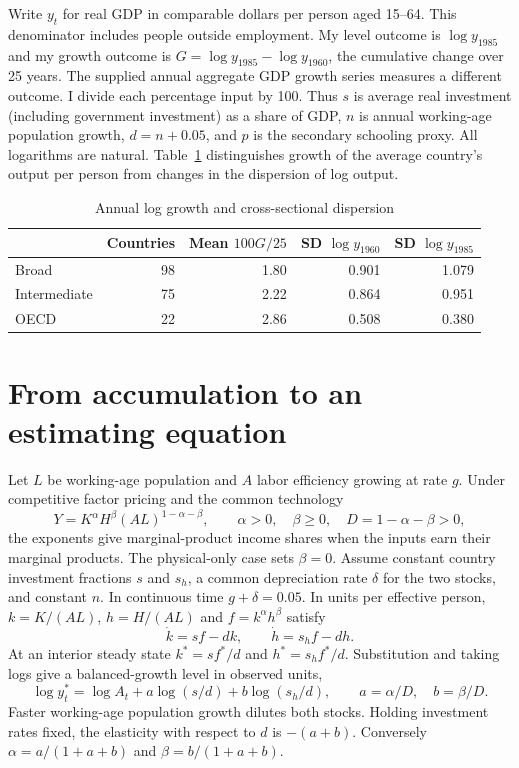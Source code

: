 \documentclass[11pt]{article}
\begin{document}
Write $y_t$ for real GDP in comparable dollars per person aged 15--64. This denominator includes people outside employment. My level outcome is $\log y_{1985}$ and my growth outcome is $G=\log y_{1985}-\log y_{1960}$, the cumulative change over 25 years. The supplied annual aggregate GDP growth series measures a different outcome. I divide each percentage input by 100. Thus $s$ is average real investment (including government investment) as a share of GDP, $n$ is annual working-age population growth, $d=n+0.05$, and $p$ is the secondary schooling proxy. All logarithms are natural. Table~\ref{desc} distinguishes growth of the average country's output per person from changes in the dispersion of log output.

\begin{table}[ht]
\centering
\caption{Annual log growth and cross-sectional dispersion}\label{desc}
\begin{tabular}{lrrrr}
\toprule
&Countries&Mean $100G/25$&SD $\log y_{1960}$&SD $\log y_{1985}$\\
\midrule
Broad&98&1.80&0.901&1.079\\
Intermediate&75&2.22&0.864&0.951\\
OECD&22&2.86&0.508&0.380\\
\bottomrule
\end{tabular}
\end{table}

\section{From accumulation to an estimating equation}
Let $L$ be working-age population and $A$ labor efficiency growing at rate $g$. Under competitive factor pricing and the common technology
\[
 Y=K^\alpha H^\beta(AL)^{1-\alpha-\beta},
 \qquad \alpha>0,\quad \beta\geq0,\quad D=1-\alpha-\beta>0,
\]
the exponents give marginal-product income shares when the inputs earn their marginal products. The physical-only case sets $\beta=0$. Assume constant country investment fractions $s$ and $s_h$, a common depreciation rate $\delta$ for the two stocks, and constant $n$. In continuous time $g+\delta=0.05$. In units per effective person, $k=K/(AL)$, $h=H/(AL)$ and $f=k^\alpha h^\beta$ satisfy
\[
 \dot k=sf-dk,\qquad \dot h=s_h f-dh .
\]
At an interior steady state $k^*=sf^*/d$ and $h^*=s_h f^*/d$. Substitution and taking logs give a balanced-growth level in observed units,
\begin{equation}
 \log y_t^*=\log A_t+a\log(s/d)+b\log(s_h/d),\qquad
 a=\alpha/D,\quad b=\beta/D.\label{level}
\end{equation}
Faster working-age population growth dilutes both stocks. Holding investment rates fixed, the elasticity with respect to $d$ is $-(a+b)$. Conversely $\alpha=a/(1+a+b)$ and $\beta=b/(1+a+b)$.
\end{document}
